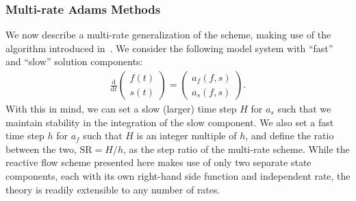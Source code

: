 
\subsubsection{Multi-rate Adams Methods} \label{sec:multirate}

We now describe a multi-rate generalization of the scheme, making use of the
algorithm introduced in~\cite{gear1984multirate}.  We consider the following
model system with ``fast'' and ``slow'' solution components:
\begin{align}
\frac{\textrm{d}}{\textrm{d}t}\left( \begin{array}{c} f(t) \\ s(t) \end{array} \right) = \left( \begin{array}{c} a_{f}(f,s) \\ a_{s}(f,s) \end{array} \right). \label{eq:mrab}
\end{align}
With this in mind, we can set a slow (larger) time step $H$ for $a_{s}$ such
that we maintain stability in the integration of the slow component.  We also
set a fast time step $h$ for $a_{f}$ such that $H$ is an integer multiple of
$h$, and define the ratio between the two, $\text{SR} = H/h$, as the step ratio
of the multi-rate scheme. While the reactive flow scheme presented here makes
use of only two separate state components, each with its own right-hand side
function and independent rate, the theory is readily extensible to any number
of rates.

